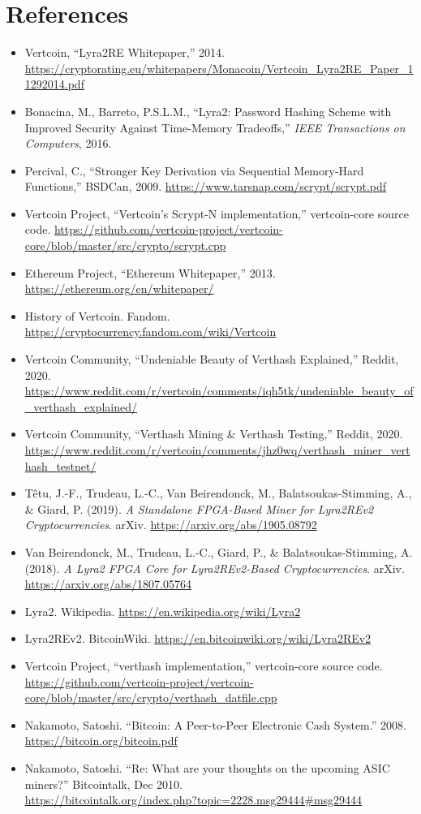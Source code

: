 \documentclass[12pt]{article}
\begin{document}
\section{References}
\begin{itemize}
    \item Vertcoin, ``Lyra2RE Whitepaper,'' 2014. \url{https://cryptorating.eu/whitepapers/Monacoin/Vertcoin_Lyra2RE_Paper_11292014.pdf}
    \item Bonacina, M., Barreto, P.S.L.M., ``Lyra2: Password Hashing Scheme with Improved Security Against Time-Memory Tradeoffs,'' \emph{IEEE Transactions on Computers}, 2016.
    \item Percival, C., ``Stronger Key Derivation via Sequential Memory-Hard Functions,'' BSDCan, 2009. \url{https://www.tarsnap.com/scrypt/scrypt.pdf}
    \item Vertcoin Project, ``Vertcoin's Scrypt-N implementation,'' vertcoin-core source code. \url{https://github.com/vertcoin-project/vertcoin-core/blob/master/src/crypto/scrypt.cpp}
    \item Ethereum Project, ``Ethereum Whitepaper,'' 2013. \url{https://ethereum.org/en/whitepaper/}
    \item History of Vertcoin. Fandom.   \url{https://cryptocurrency.fandom.com/wiki/Vertcoin}
    \item Vertcoin Community, ``Undeniable Beauty of Verthash Explained,'' Reddit, 2020. \url{https://www.reddit.com/r/vertcoin/comments/iqh5tk/undeniable_beauty_of_verthash_explained/}
    \item Vertcoin Community, ``Verthash Mining \& Verthash Testing,'' Reddit, 2020. \url{https://www.reddit.com/r/vertcoin/comments/jhz0wq/verthash_miner_verthash_testnet/}
     \item Têtu, J.-F., Trudeau, L.-C., Van Beirendonck, M., Balatsoukas-Stimming, A., \& Giard, P. (2019). \textit{A Standalone FPGA-Based Miner for Lyra2REv2 Cryptocurrencies}. arXiv. \url{https://arxiv.org/abs/1905.08792}
   \item Van Beirendonck, M., Trudeau, L.-C., Giard, P., \& Balatsoukas-Stimming, A. (2018). \textit{A Lyra2 FPGA Core for Lyra2REv2-Based Cryptocurrencies}. arXiv. \url{https://arxiv.org/abs/1807.05764}
   \item Lyra2. Wikipedia. \url{https://en.wikipedia.org/wiki/Lyra2}
   \item Lyra2REv2. BitcoinWiki. \url{https://en.bitcoinwiki.org/wiki/Lyra2REv2}
   \item Vertcoin Project, ``verthash implementation,'' vertcoin-core source code.\\ \url{https://github.com/vertcoin-project/vertcoin-core/blob/master/src/crypto/verthash_datfile.cpp}
   \item Nakamoto, Satoshi. ``Bitcoin: A Peer-to-Peer Electronic Cash System.'' 2008. \url{https://bitcoin.org/bitcoin.pdf}
   \item Nakamoto, Satoshi. ``Re: What are your thoughts on the upcoming ASIC miners?'' Bitcointalk, Dec 2010.\\ \url{https://bitcointalk.org/index.php?topic=2228.msg29444#msg29444}

\end{itemize}
\end{document}
